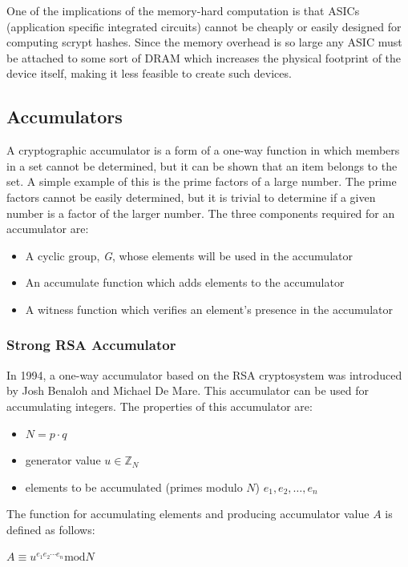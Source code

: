 \documentclass[11pt]{article}
\begin{document}
One of the implications of the memory-hard computation is that ASICs (application specific integrated circuits) cannot
be cheaply or easily designed for computing scrypt hashes. Since the memory overhead is so large any ASIC must be
attached to some sort of DRAM which increases the physical footprint of the device itself, making it less feasible to
create such devices.

\subsection{Accumulators}
A cryptographic accumulator is a form of a one-way function in which members in a set cannot be determined, but it can
be shown that an item belongs to the set. A simple example of this is the prime factors of a large number. The prime
factors cannot be easily determined, but it is trivial to determine if a given number is a factor of the larger number.
The three components required for an accumulator are:
\begin{itemize}
    \item A cyclic group, \emph{G}, whose elements will be used in the accumulator
    \item An accumulate function which adds elements to the accumulator
    \item A witness function which verifies an element's presence in the accumulator
\end{itemize}

\subsubsection{Strong RSA Accumulator}
In 1994, a one-way accumulator based on the RSA cryptosystem was introduced by Josh Benaloh and Michael De
Mare.\cite{benaloh1994} This accumulator can be used for accumulating integers. The properties of this accumulator are:
\begin{itemize}
    \item $N = p \cdot q$
    \item generator value $u \in \mathbb{Z}_N$
    \item elements to be accumulated (primes modulo $N$) $e_1, e_2, \ldots, e_n$
\end{itemize}

The function for accumulating elements and producing accumulator value $A$ is defined as follows:
\begin{center}
    $A \equiv u^{e_1 e_2 \cdots e_n} \textrm{mod} N$
\end{center}
\end{document}
